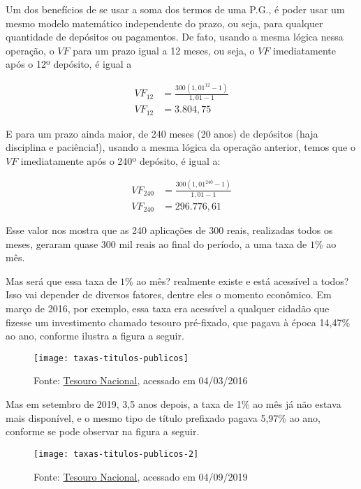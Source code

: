 Um dos benefícios de se usar a soma dos termos de uma P.G., é poder usar um mesmo modelo matemático independente do prazo, ou seja, para qualquer quantidade de depósitos ou pagamentos. De fato, usando a mesma lógica nessa operação, o $\mathit{VF}$ para um prazo igual a 12 meses, ou seja, o $\mathit{VF}$ imediatamente após o 12º depósito, é igual a

\begin{align*}
\mathit{VF}_{12}&=\frac{300(1{,}01^{12}-1)}{1{,}01-1}\\
\mathit{VF}_{12}&=3.804{,}75
\end{align*}

E para um prazo ainda maior, de 240 meses (20 anos) de depósitos (haja disciplina e paciência!), usando a mesma lógica da operação anterior, temos que o $\mathit{VF}$ imediatamente após o 240º depósito, é igual a:

\begin{align*}
\mathit{VF}_{240}&=\frac{300(1{,}01^{240}-1)}{1,01-1}\\
\mathit{VF}_{240}&=296.776{,}61
\end{align*}

Esse valor nos mostra que as 240 aplicações de 300 reais, realizadas todos os meses, geraram quase 300 mil reais ao final do período, a uma taxa de $1$\% ao mês. 


Mas será que essa taxa de $1\%$ ao mês? realmente existe e está acessível a todos? Isso vai depender de diversos fatores, dentre eles o momento econômico. Em março de 2016, por exemplo, essa taxa era acessível a qualquer cidadão que fizesse um investimento chamado tesouro pré-fixado, que pagava à época 14,47\% ao ano, conforme ilustra a figura a seguir.

\begin{figure}[H]

\centering
\texttt{[image: taxas-titulos-publicos]}
\caption{Fonte: \href{http://www.tesouro.fazenda.gov.br/tesouro-direto-precos-e-taxas-dos-titulos}{Tesouro Nacional}, acessado em 04/03/2016}

\end{figure}

Mas em setembro de 2019, 3,5 anos depois, a taxa de 1\% ao mês já não estava mais disponível, e o mesmo tipo de título prefixado pagava 5,97\% ao ano, conforme se pode observar na figura a seguir.

\begin{figure}[H]

\centering
\texttt{[image: taxas-titulos-publicos-2]}
\caption{Fonte: \href{http://www.tesouro.fazenda.gov.br/tesouro-direto-precos-e-taxas-dos-titulos}{Tesouro Nacional}, acessado em 04/09/2019}

\end{figure}

